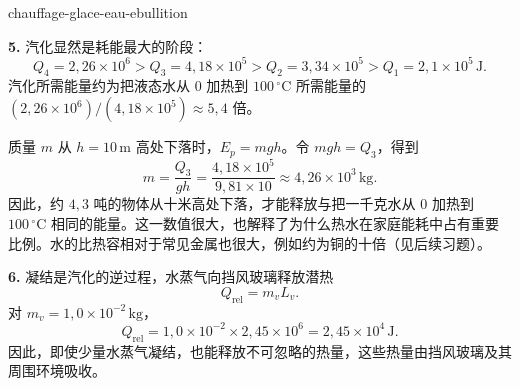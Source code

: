 \begin{exo}{chauffage-glace-eau-ebullition}
\begin{solution}
\textbf{5.} 汽化显然是耗能最大的阶段：
\[
Q_4=2{,}26\times10^6>Q_3=4{,}18\times10^5>Q_2=3{,}34\times10^5>Q_1=2{,}1\times10^5\,\text{J}.
\]
汽化所需能量约为把液态水从 $0$ 加热到 $100\,{}^\circ\text{C}$ 所需能量的 $(2{,}26\times10^6)/(4{,}18\times10^5)\approx5{,}4$ 倍。

质量 $m$ 从 $h=10\,\text{m}$ 高处下落时，$E_p=mgh$。令 $mgh=Q_3$，得到
\[
m=\frac{Q_3}{gh}=\frac{4{,}18\times10^5}{9{,}81\times10}
\approx4{,}26\times10^3\,\text{kg}.
\]
因此，约 $4{,}3$ 吨的物体从十米高处下落，才能释放与把一千克水从 $0$ 加热到 $100\,{}^\circ\text{C}$ 相同的能量。这一数值很大，也解释了为什么热水在家庭能耗中占有重要比例。水的比热容相对于常见金属也很大，例如约为铜的十倍（见后续习题）。

\textbf{6.} 凝结是汽化的逆过程，水蒸气向挡风玻璃释放潜热
\[
Q_{\text{rel}}=m_vL_v.
\]
对 $m_v=1{,}0\times10^{-2}\,\text{kg}$，
\[
Q_{\text{rel}}=1{,}0\times10^{-2}\times2{,}45\times10^6
=2{,}45\times10^4\,\text{J}.
\]
因此，即使少量水蒸气凝结，也能释放不可忽略的热量，这些热量由挡风玻璃及其周围环境吸收。
\end{solution}
\end{exo}

